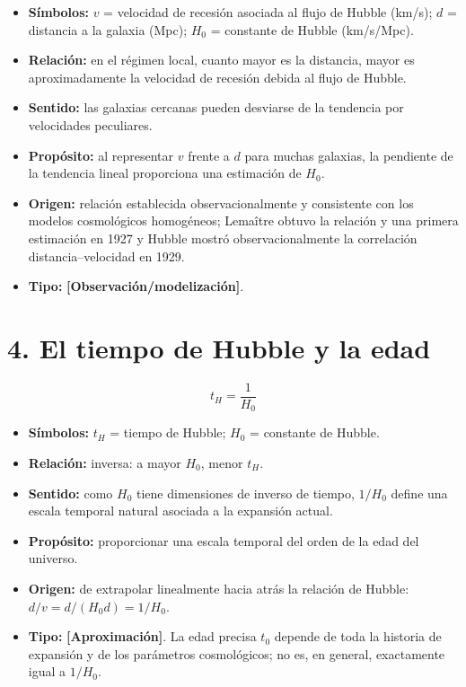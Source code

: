 \begin{itemize}
  \item \textbf{Símbolos:} $v$ = velocidad de recesión asociada al flujo de Hubble (km/s); $d$ = distancia a la galaxia (Mpc); $H_0$ = constante de Hubble (km/s/Mpc).
  \item \textbf{Relación:} en el régimen local, cuanto mayor es la distancia, mayor es aproximadamente la velocidad de recesión debida al flujo de Hubble.
  \item \textbf{Sentido:} las galaxias cercanas pueden desviarse de la tendencia por velocidades peculiares.
  \item \textbf{Propósito:} al representar $v$ frente a $d$ para muchas galaxias, la pendiente de la tendencia lineal proporciona una estimación de $H_0$.
  \item \textbf{Origen:} relación establecida observacionalmente y consistente con los modelos cosmológicos homogéneos; Lemaître obtuvo la relación y una primera estimación en 1927 y Hubble mostró observacionalmente la correlación distancia--velocidad en 1929.
  \item \textbf{Tipo:} \textbf{[Observación/modelización]}.
\end{itemize}

\section*{4. El tiempo de Hubble y la edad}

\[ t_H = \frac{1}{H_0} \]

\begin{itemize}
  \item \textbf{Símbolos:} $t_H$ = tiempo de Hubble; $H_0$ = constante de Hubble.
  \item \textbf{Relación:} inversa: a mayor $H_0$, menor $t_H$.
  \item \textbf{Sentido:} como $H_0$ tiene dimensiones de inverso de tiempo, $1/H_0$ define una escala temporal natural asociada a la expansión actual.
  \item \textbf{Propósito:} proporcionar una escala temporal del orden de la edad del universo.
  \item \textbf{Origen:} de extrapolar linealmente hacia atrás la relación de Hubble: $d/v=d/(H_0d)=1/H_0$.
  \item \textbf{Tipo:} \textbf{[Aproximación]}. La edad precisa $t_0$ depende de toda la historia de expansión y de los parámetros cosmológicos; no es, en general, exactamente igual a $1/H_0$.
\end{itemize}

